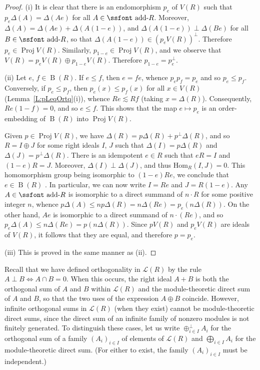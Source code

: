 \documentclass[psamsfonts,reqno]{memo-l}
\theoremstyle{plain}
\theoremstyle{definition}
\theoremstyle{remark}
\numberwithin{equation}{section}
\DeclareMathOperator{\rB}{B}
\DeclareMathOperator{\BB}{Proj}
\newcommand{\famm}[2]{(#1)_{#2}}
\newcommand{\Lat}{\mathcal{L}}
\newcommand{\addR}{\mbox{\ssfont add-}R}
\newcommand{\Hom}{\mathrm{Hom}}
\begin{document}
\begin{proof} (i) It is clear that there is an endomorphism $p_e$
of $V(R)$ such that $p_e\Delta(A)= \Delta(Ae)$ for all
$A\in
\addR$. Moreover, $\Delta(A)= \Delta(Ae)+ \Delta(A(1-e))$, and
$\Delta(A(1-e))\perp \Delta(Be)$ for all $B\in\addR$, so that
$\Delta(A(1-e)) \in (p_eV(R))^\perp$. Therefore\index{pzzroj@$\BB{S}$}
$p_e\in \BB V(R)$. Similarly, $p_{1-e}\in \BB V(R)$,
and we observe that
$V(R)= p_eV(R)\oplus p_{1-e}V(R)$. Therefore $p_{1-e}= p_e^\perp$.

(ii) Let $e$, $f\in \rB(R)$. If $e\leq f$, then $e=fe$, whence $p_ep_f=
p_e$ and so $p_e\leq p_f$. Conversely, if $p_e\leq p_f$, then
$p_e(x)\leq p_f(x)$ for all $x\in V(R)$
(Lemma~\ref{L:pLeqOrtq}(i)), whence
$Re\lesssim Rf$ (taking $x= \Delta(R)$). Consequently,
$Re(1-f)=0$, and so $e\leq f$. This shows that the map $e\mapsto
p_e$ is an order-embedding of $\rB(R)$ into
\index{pzzroj@$\BB{S}$}%
$\BB V(R)$.

Given\index{pzzroj@$\BB{S}$} $p\in \BB V(R)$, we have $\Delta(R)= p\Delta(R)+
p^\perp\Delta(R)$, and so $R= I\oplus J$ for some right ideals
$I$, $J$ such that $\Delta(I)= p\Delta(R)$ and $\Delta(J)=
p^\perp\Delta(R)$. There is an idempotent $e\in R$ such that $eR=
I$ and $(1-e)R= J$. Moreover,
$\Delta(I)\perp\Delta(J)$, and thus $\Hom_R(I,J) =0$.
This homomorphism group being isomorphic to $(1-e)Re$, we conclude
that $e\in \rB(R)$ \cite[Lemma~3.1]{GvnRR}. In
particular, we can now write $I= Re$ and $J= R(1-e)$. Any $A\in\addR$ is
isomorphic to a direct summand of $n\cdot R$ for some positive integer $n$,
whence
$p\Delta(A)\leq np\Delta(R)= n\Delta(Re)= p_e(n\Delta(R))$. On the
other hand,
$Ae$ is isomorphic to a direct summand of $n\cdot(Re)$, and so
$p_e\Delta(A)\leq n\Delta(Re)= p(n\Delta(R))$. Since
$pV(R)$ and
$p_eV(R)$ are ideals of $V(R)$, it follows that they are equal,
and therefore $p=p_e$.

(iii) This is proved in the same manner as (ii). \end{proof}

Recall that we have defined orthogonality in $\Lat(R)$ by the rule
$A\perp B \Longleftrightarrow A\cap B =0$. When this occurs, the
right ideal $A+B$ is both the orthogonal sum of $A$ and $B$ within
$\Lat(R)$ and the module-theoretic direct sum of $A$ and $B$, so
that the two uses of the expression $A\oplus B$ coincide. However,
infinite orthogonal sums in $\Lat(R)$ (when they exist) cannot
be module-theoretic direct sums, since the direct sum of an
infinite family of nonzero modules is not finitely generated. To
distinguish these cases, let us write $\oplus^\perp_{i\in I} A_i$
for the orthogonal sum of a family
$\famm{A_i}{i\in I}$ of elements of $\Lat(R)$ and $\bigoplus_{i\in I} A_i$
for the module-theoretic direct sum. (For either to exist, the family
$\famm{A_i}{i\in I}$ must be independent.)
\end{document}
